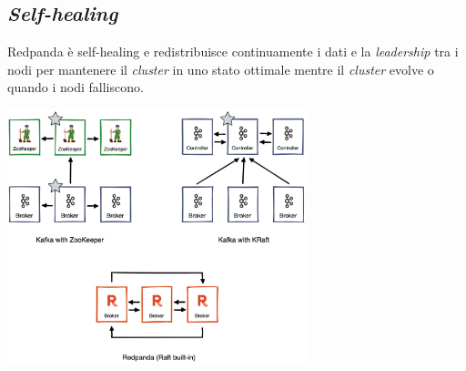 \subsection{\textit{Self-healing}}
Redpanda è self-healing e redistribuisce continuamente i dati e la \textit{leadership} tra i nodi per mantenere il \textit{cluster} in uno stato ottimale mentre il \textit{cluster} evolve o quando i nodi falliscono.


\begin{center}
	\includegraphics[width=0.65\textwidth]{imgs/kafka_zookeeper.png}
\end{center}






